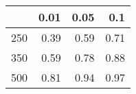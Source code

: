 % 
\begin{tabular}{rrrr}
  \hline
 & 0.01 & 0.05 & 0.1 \\ 
  \hline
250 & 0.39 & 0.59 & 0.71 \\ 
  350 & 0.59 & 0.78 & 0.88 \\ 
  500 & 0.81 & 0.94 & 0.97 \\ 
   \hline
\end{tabular}
